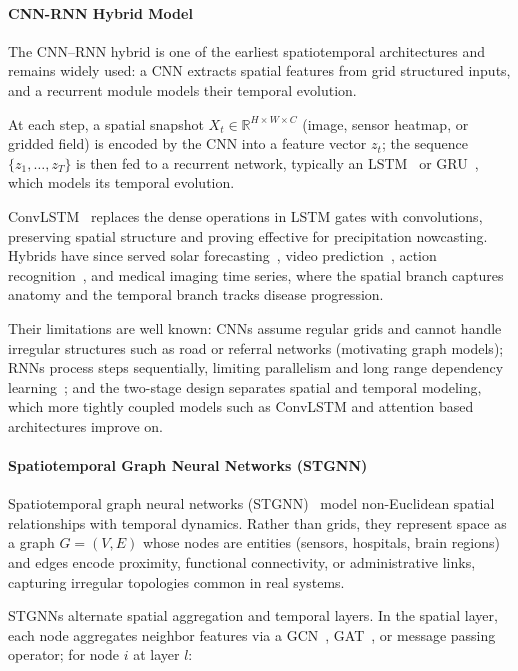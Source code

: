 \documentclass[journal]{IEEEtran}
\begin{document}
\paragraph{CNN-RNN Hybrid Model}
The CNN--RNN hybrid is one of the earliest spatiotemporal architectures and remains widely used: a CNN extracts spatial features from grid structured inputs, and a recurrent module models their temporal evolution.
 
At each step, a spatial snapshot $X_t \in \mathbb{R}^{H \times W \times C}$ (image, sensor heatmap, or gridded field) is encoded by the CNN into a feature vector $z_t$; the sequence $\{z_1,\ldots,z_T\}$ is then fed to a recurrent network, typically an LSTM~\cite{rnn_lstm} or GRU~\cite{cho2014gru}, which models its temporal evolution.
 
ConvLSTM~\cite{shi2015convolutional} replaces the dense operations in LSTM gates with convolutions, preserving spatial structure and proving effective for precipitation nowcasting. Hybrids have since served solar forecasting~\cite{li2025solar}, video prediction~\cite{srivastava2015unsupervised}, action recognition~\cite{donahue2015longterm}, and medical imaging time series, where the spatial branch captures anatomy and the temporal branch tracks disease progression.
 
Their limitations are well known: CNNs assume regular grids and cannot handle irregular structures such as road or referral networks (motivating graph models); RNNs process steps sequentially, limiting parallelism and long range dependency learning~\cite{bengio1994learning}; and the two-stage design separates spatial and temporal modeling, which more tightly coupled models such as ConvLSTM and attention based architectures improve on.
 
\paragraph{Spatiotemporal Graph Neural Networks (STGNN)}
Spatiotemporal graph neural networks (STGNN)~\cite{shao2022longterm} model non-Euclidean spatial relationships with temporal dynamics. Rather than grids, they represent space as a graph $G=(V,E)$ whose nodes are entities (sensors, hospitals, brain regions) and edges encode proximity, functional connectivity, or administrative links, capturing irregular topologies common in real systems.
 
STGNNs alternate spatial aggregation and temporal layers. In the spatial layer, each node aggregates neighbor features via a GCN~\cite{kipf2017gcn}, GAT~\cite{velickovic2018gat}, or message passing operator; for node $i$ at layer $l$:
 
\end{document}
